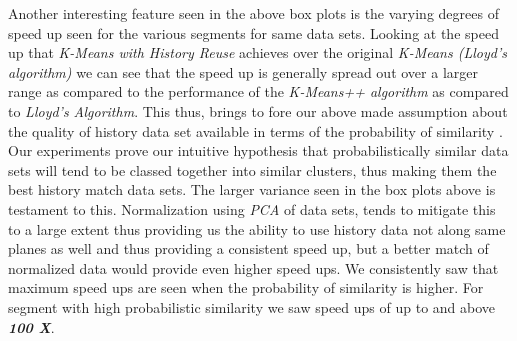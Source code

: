 Another interesting feature seen in the above box plots is the varying degrees of speed up seen for the various segments for same data sets. Looking at the speed up that \textit{K-Means with History Reuse} achieves over the original \textit{K-Means (Lloyd’s algorithm)} we can see that the speed up is generally spread out over a larger range as compared to the performance of the \textit{K-Means++ algorithm} as compared to \textit{Lloyd’s Algorithm}. This thus, brings to fore our above made assumption about the quality of history data set available in terms of the probability of similarity . Our experiments prove our intuitive hypothesis that probabilistically similar data sets will tend to be classed together into similar clusters, thus making them the best history match data sets. The larger variance seen in the box plots above is testament to this. Normalization using \textit{PCA} of data sets, tends to mitigate this to a large extent thus providing us the ability to use history data not along same planes as well and thus providing a consistent speed up, but a better match of normalized data would provide even higher speed ups. We consistently saw that maximum speed ups are seen when the probability of similarity is higher. For segment with high probabilistic similarity we saw speed ups of up to and above \textit{\textbf{100 X}}.

